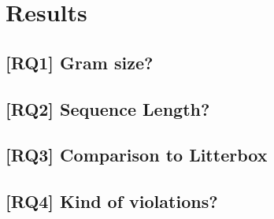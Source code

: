 \chapter{Results}\label{chap:results}

\section{[RQ1] Gram size?}

\section{[RQ2] Sequence Length?}

\section{[RQ3] Comparison to Litterbox}

\section{[RQ4] Kind of violations?}


